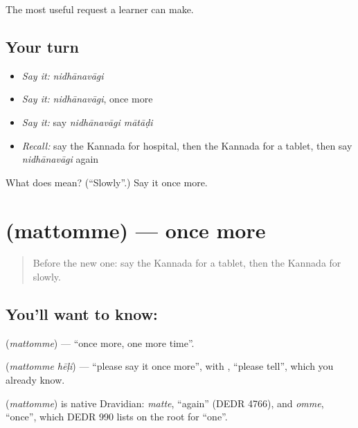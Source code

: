 \begin{grammarlens}[title={What you've built}]
The most useful request a learner can make.
\end{grammarlens}

\subsection*{Your turn}
\begin{itemize}
\raggedright
  \item \emph{Say it:} \emph{nidhānavāgi}
  \item \emph{Say it:} \emph{nidhānavāgi}, once more
  \item \emph{Say it:} say \emph{nidhānavāgi mātāḍi}
  \item \emph{Recall:} say the Kannada for hospital, then the Kannada for a tablet, then say \emph{nidhānavāgi} again
\end{itemize}

\begin{tcolorbox}[breakable,colback=teal!4,colframe=teal!35!black,title={Before you move on}]
What does  mean? (\textquotedblleft{}Slowly\textquotedblright{}.) Say it once more.
\end{tcolorbox}
\section[\texorpdfstring{\kn{ಮತ್ತೊಮ್ಮೆ} (mattomme)}{ಮತ್ತೊಮ್ಮೆ (mattomme)}]{ (mattomme) — once more}

\label{lesson:KA-C85-oncemore}



\begin{quote}
Before the new one: say the Kannada for a tablet, then the Kannada for slowly.
\end{quote}

\subsection*{You'll want to know: }
\textbf{} (\emph{mattomme}) — \textquotedblleft{}once more, one more time\textquotedblright{}.

\textbf{ } (\emph{mattomme hēḷi}) — \textquotedblleft{}please say it once more\textquotedblright{}, with \textbf{}, \textquotedblleft{}please tell\textquotedblright{}, which you already know.

\begin{cousinweb}
\textbf{} (\emph{mattomme}) is native Dravidian: \emph{matte}, \textquotedblleft{}again\textquotedblright{} (DEDR 4766), and \emph{omme}, \textquotedblleft{}once\textquotedblright{}, which DEDR 990 lists on the root for \textquotedblleft{}one\textquotedblright{}.
\end{cousinweb}

